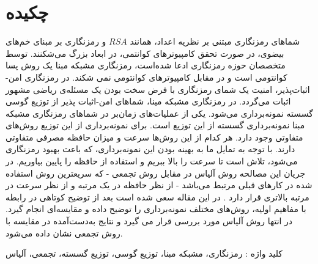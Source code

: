 {%
	\makeCondensedChap
	\chapter*{چکیده}
}

شماهای رمزنگاری مبتنی بر نظریه اعداد، همانند  $RSA$ و رمزنگاری بر مبنای خم‌های بیضوی، در صورت تحقق کامپیوترهای کوانتمی، در ابعاد بزرگ می‌شکنند. توسط متخصصان حوزه رمزنگاری ادعا شده‌است، رمزنگاری مشبکه مبنا  یک روش پسا کوانتومی است و در مقابل کامپیوترهای کوانتومی نمی شکند. در رمزنگاری امن-اثبات‌پذیر، امنیت یک شمای رمزنگاری با فرض سخت‌ بودن یک مسئله‌ی ریاضی مشهور اثبات می‌گردد. در رمزنگاری مشبکه مینا، شماهای امن-اثبات پذیر از توزیع گوسی گسسته نمونه‌برداری می‌شود. یکی از عملیات‌های زمان‌بر در شماهای رمزنگاری مشبکه مبنا  نمونه‌برداری  گسسته از  این توزیع است. برای نمونه‌برداری از این توزیع روش‌های متفاوتی وجود دارد. هر کدام از این روش‌ها سرعت و میزان حافظه مصرفی متفاوتی دارند. با توجه به تمایل ما به بهینه بودن این نمونه‌برداری، که باعث بهبود رمزنگاری می‌شود، تلاش است تا سرعت را بالا ببریم و استفاده از حافظه را پایین بیاوریم. در جریان این مصالحه روش  آلیاس در مقابل روش تجمعی - که سریعترین روش استفاده شده در کارهای قبلی مرتبط می‌باشد - از نظر حافظه در یک مرتبه و از نظر سرعت در مرتبه بالاتری قرار دارد . در این مقاله سعی شده است بعد از توضیح کوتاهی در رابطه با مفاهیم اولیه، روش‌های مختلف نمونه‌برداری را توضیح داده و مقایسه‌ای انجام گیرد. در انتها روش آلیاس مورد بررسی قرار می گیرد و نتایج به‌دست‌آمده در مقایسه با روش تجمعی نشان داده می‌شود. 

کلید واژه : رمزنگاری، مشبکه مبنا، توزیع گوسی، توزیع گسسته، تجمعی، آلیاس